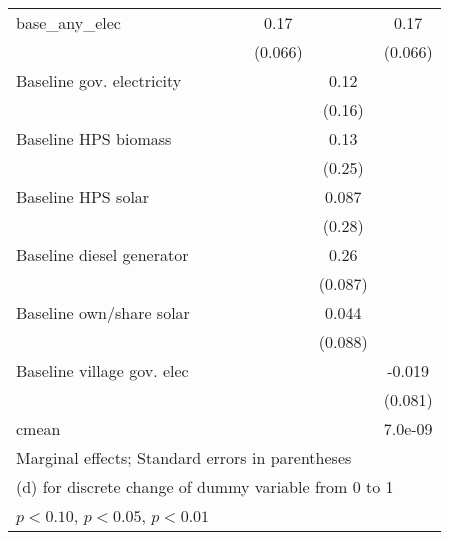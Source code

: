 \begin{table}[htbp]
\begin{tabular*}{1\hsize}{@{\hskip\tabcolsep\extracolsep\fill}l*{6}{c}}
base\_any\_elec   &                  &                  &                  &     0.17\sym{**} &                  &     0.17\sym{**} \\
                &                  &                  &                  &  (0.066)         &                  &  (0.066)         \\
Baseline gov. electricity&                  &                  &                  &                  &     0.12         &                  \\
                &                  &                  &                  &                  &   (0.16)         &                  \\
Baseline HPS biomass&                  &                  &                  &                  &     0.13         &                  \\
                &                  &                  &                  &                  &   (0.25)         &                  \\
Baseline HPS solar&                  &                  &                  &                  &    0.087         &                  \\
                &                  &                  &                  &                  &   (0.28)         &                  \\
Baseline diesel generator&                  &                  &                  &                  &     0.26\sym{***}&                  \\
                &                  &                  &                  &                  &  (0.087)         &                  \\
Baseline own/share solar&                  &                  &                  &                  &    0.044         &                  \\
                &                  &                  &                  &                  &  (0.088)         &                  \\
Baseline village gov. elec&                  &                  &                  &                  &                  &   -0.019         \\
                &                  &                  &                  &                  &                  &  (0.081)         \\
\midrule
cmean           &                  &                  &                  &                  &                  &  7.0e-09         \\
\bottomrule
\multicolumn{7}{l}{\footnotesize Marginal effects; Standard errors in parentheses}\\
\multicolumn{7}{l}{\footnotesize  (d) for discrete change of dummy variable from 0 to 1}\\
\multicolumn{7}{l}{\footnotesize \sym{*} \(p<0.10\), \sym{**} \(p<0.05\), \sym{***} \(p<0.01\)}\\
\end{tabular*}
\end{table}
